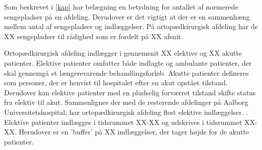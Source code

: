 Som beskrevet i \ref{kap} har belægning en betydning for antallet af normerede sengepladser på en afdeling. Derudover er det vigtigt at der er en sammenhæng mellem antal af sengepladser og indlæggelser. På ortopædkirurgisk afdeling har de XX sengepladser til rådighed som er fordelt på XX afsnit. 

Ortopædkirurgisk afdeling indlægger i gennemsnit XX elektive og XX akutte patienter. Elektive patienter omfatter både indlagte og ambulante patienter, der skal gennemgå et længerevarende behandlingsforløb. Akutte patienter defineres som personer, der er henvist til hospitalet efter en akut opstået tilstand. Derudover kan elektive patienter med en pludselig forværret tilstand skifte status fra elektiv til akut.
Sammenlignes der med de resterende afdelinger på Aalborg Universitetshospital, har ortopædkirurgisk afdeling flest elektive indlæggelser. \cite{RegionNord2016}. Elektive patienter indlægges i tidsrummet XX-XX og udskrives i tidsrummet XX-XX. Herudover er en 'buffer' på XX indlæggelser, der tager højde for de akutte patienter. 